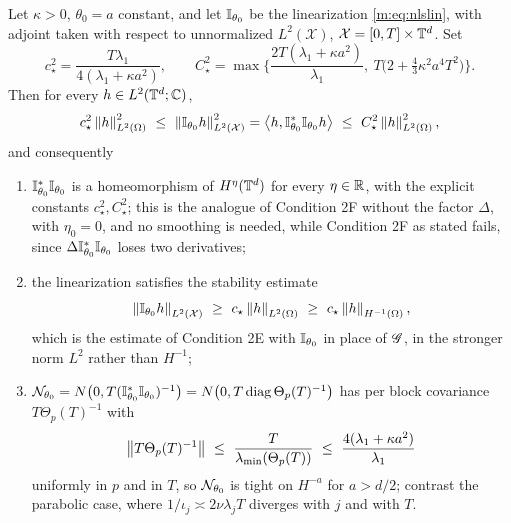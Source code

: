 \begin{corollary}\label{m:cor:condE}
Let $\kappa>0$, $\theta_0=a$ constant, and let $\mathbb{I}_{\theta_0}$ be the linearization \eqref{m:eq:nlslin}, with adjoint taken with respect to unnormalized $L^2(\mathcal X)$, $\mathcal X=[0,T]\times\mathbb{T}^d$. Set
\[
c_\star^2=\frac{T\lambda_1}{4(\lambda_1+\kappa a^2)},\qquad
C_\star^2=\max\Big\{\frac{2T(\lambda_1+\kappa a^2)}{\lambda_1},\ T\big(2+\tfrac43\kappa^2a^4T^2\big)\Big\}.
\]
Then for every $h\in L^2(\mathbb{T}^d;\mathbb{C})$,
\[
c_\star^2\norm{h}_{L^2(\Omega)}^2\ \le\ \norm{\I_{\theta_0}h}^2_{L^2(\mathcal X)}=\big\langle h,\I^*_{\theta_0}\I_{\theta_0}h\big\rangle\ \le\ C_\star^2\norm{h}_{L^2(\Omega)}^2,
\]
and consequently
\begin{enumerate}[label=(\alph*),nosep,leftmargin=2.2em]
\item $\mathbb{I}^*_{\theta_0}\mathbb{I}_{\theta_0}$ is a homeomorphism of $H^\eta(\mathbb{T}^d)$ for every $\eta\in\mathbb{R}$, with the explicit constants $c_\star^2,C_\star^2$; this is the analogue of Condition 2F without the factor $\Delta$, with $\eta_0=0$, and no smoothing is needed, while Condition 2F as stated fails, since $\Delta\mathbb{I}^*_{\theta_0}\mathbb{I}_{\theta_0}$ loses two derivatives;
\item the linearization satisfies the stability estimate
\[
\norm{\I_{\theta_0}h}_{L^2(\mathcal X)}\ \ge\ c_\star\norm{h}_{L^2(\Omega)}\ \ge\ c_\star\norm{h}_{H^{-1}(\Omega)} ,
\]
which is the estimate of Condition 2E with $\mathbb{I}_{\theta_0}$ in place of $\mathscr{G}$, in the stronger norm $L^2$ rather than $H^{-1}$;
\item $\mathcal{N}_{\theta_0}=N\big(0,T(\mathbb{I}^*_{\theta_0}\mathbb{I}_{\theta_0})^{-1}\big)=N\big(0,T\operatorname{diag}\Theta_p(T)^{-1}\big)$ has per block covariance $T\Theta_p(T)^{-1}$ with
\[
\norm{T\Theta_p(T)^{-1}}\ \le\ \frac{T}{\lambda_{\min}(\Theta_p(T))}\ \le\ \frac{4(\lambda_1+\kappa a^2)}{\lambda_1}
\]
uniformly in $p$ and in $T$, so $\mathcal{N}_{\theta_0}$ is tight on $H^{-a}$ for $a>d/2$; contrast the parabolic case, where $1/\iota_j\asymp2\nu\lambda_jT$ diverges with $j$ and with $T$.
\end{enumerate}
\end{corollary}

